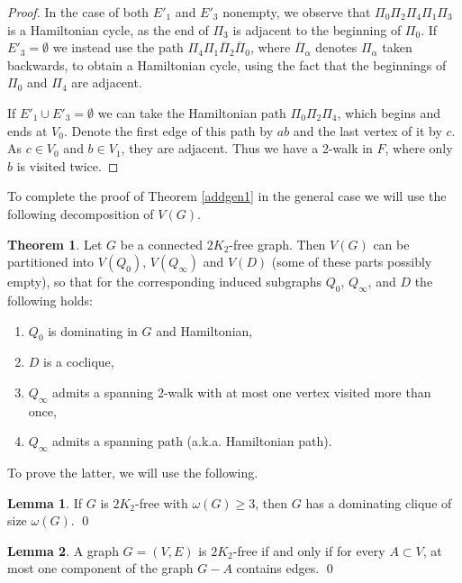 \documentclass{amsart}
\theoremstyle{definition}
\newtheorem{theorem}{Theorem}
\newtheorem{lemma}{Lemma}
\begin{document}
\begin{proof}
In the case of both $E'_1$ and $E'_3$ nonempty, we observe that 
$\Pi_0\Pi_2\Pi_4\Pi_1\Pi_3$ is a Hamiltonian cycle, as the end of
$\Pi_3$ is adjacent to the beginning of $\Pi_0$. 
If $E'_3=\emptyset$  
we instead use the path 
$\Pi_4\Pi_1\overline{\Pi}_2\overline{\Pi}_0$, where $\overline{\Pi}_\alpha$
denotes $\Pi_\alpha$ taken backwards, to obtain a Hamiltonian
cycle, using the fact that the beginnings of $\Pi_0$ and $\Pi_4$ are
adjacent.

If $E'_1\cup E'_3=\emptyset$ 
we can take the Hamiltonian path $\Pi_0\Pi_2\Pi_4$, 
which begins and ends at $V_0$. Denote the first
edge of this path by $ab$ and the last vertex of it 
by $c$. As $c\in V_0$ and $b\in V_1$, they are adjacent.
Thus we have a 2-walk in $F$, where only $b$ is visited
twice.
\end{proof}

To complete the proof of Theorem \ref{addgen1} in the general case
we will use the following decomposition of $V(G)$.
\begin{theorem}\label{thm1}
Let $G$ be a connected $2K_2$-free graph. Then $V(G)$ 
can be partitioned into $V(Q_0)$, $V(Q_{\infty})$ and $V(D)$ (some of these parts possibly empty), so that for the corresponding induced subgraphs
$Q_0$, $Q_\infty$, and $D$ the following holds: 
\begin{enumerate}
\item $Q_0$ is dominating in $G$ and Hamiltonian, \label{i51}
\item $D$ is a coclique,\label{i52}
\item $Q_{\infty}$ admits a spanning 2-walk with at most one vertex visited more than once, \label{i53}
\item $Q_{\infty}$ admits a spanning path (a.k.a. Hamiltonian path).\label{i54}
\end{enumerate}
\end{theorem}

To prove the latter, we will use the following.
\begin{lemma}\label{lm2}{\cite[Theorem 3]{chung1990maximum}}
If $G$ is $2K_2$-free with $\omega(G)\ge3$, then $G$ has a dominating clique of size $\omega(G)$. \qed
\end{lemma}

\begin{lemma}\label{lm3}{\cite[Observation 1]{broersma2014toughness}}
A graph $G=(V,E)$ is $2K_2$-free if and only if for every $A\subset V$, at most one component of the graph $G-A$ contains edges. \qed
\end{lemma}
\end{document}
